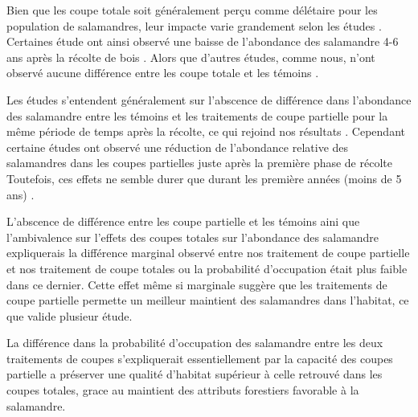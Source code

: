 Bien que les coupe totale soit généralement perçu comme délétaire pour les population de salamandres, leur impacte varie grandement selon les études \citep{Hocking2013Effectsexperimental,Chaudhary2016Impactforest}. 
Certaines étude ont ainsi observé une baisse de l'abondance des salamandre 4-6 ans après la récolte de bois \citep{Petranka1993Effectstimber,Herbeck1999PlethodontidSalamander,Grialou2000effectsforest,Macneil2014Effectstimber}. 
Alors que d'autres études, comme nous, n'ont observé aucune différence entre les coupe totale et les témoins \citep{Renken2004EffectsForest,Mazerolle2021Woodlandsalamander}.

Les études s'entendent généralement sur l'abscence de différence dans l'abondance des salamandre entre les témoins et les traitements de coupe partielle pour la même période de temps après la récolte, ce qui rejoind nos résultats \citep{McKenny2006Effectsstructural,Mazerolle2021Woodlandsalamander,Ochs2022Responseterrestrial}. 
Cependant certaine études ont observé une réduction de l'abondance relative des salamandres dans les coupes partielles juste après la première phase de récolte \citep{Harpole1999Effectsseven,Knapp2003Initialeffects,Morneault2004effectshelterwood}
Toutefois, ces effets ne semble durer que durant les première années (moins de 5 ans) \citep{Morneault2004effectshelterwood}. 

L'abscence de différence entre les coupe partielle et les témoins aini que l'ambivalence sur l'effets des coupes totales sur l'abondance des salamandre 
expliquerais la différence marginal observé entre nos traitement de coupe partielle et nos traitement de coupe totales ou la probabilité d'occupation 
était plus faible dans ce dernier.
Cette effet même si marginale suggère que les traitements de coupe partielle permette un meilleur maintient des salamandres dans l'habitat, ce que valide plusieur étude.

La différence dans la probabilité d'occupation des salamandre entre les deux traitements de coupes s'expliquerait essentiellement 
par la capacité des coupes partielle a préserver une qualité d'habitat supérieur à celle retrouvé dans les coupes totales, grace au maintient des attributs forestiers favorable à la salamandre.


